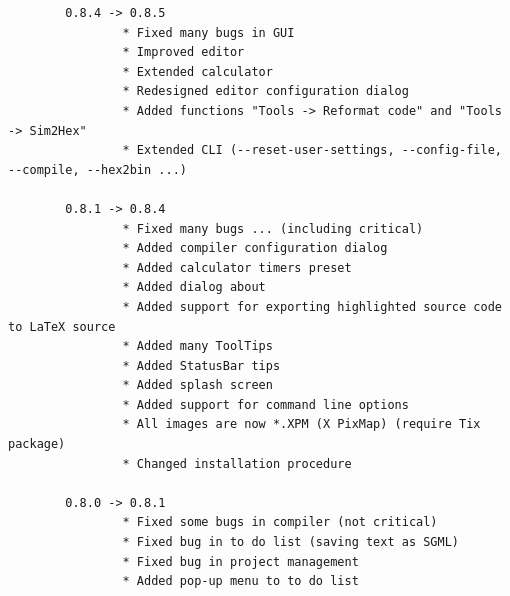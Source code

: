 \documentclass[a4paper,twoside,12pt]{book}
\begin{document}
{\begin{verbatim}
		0.8.4 -> 0.8.5
		        * Fixed many bugs in GUI
		        * Improved editor
		        * Extended calculator
		        * Redesigned editor configuration dialog
		        * Added functions "Tools -> Reformat code" and "Tools -> Sim2Hex"
		        * Extended CLI (--reset-user-settings, --config-file, --compile, --hex2bin ...)

		0.8.1 -> 0.8.4
		        * Fixed many bugs ... (including critical)
		        * Added compiler configuration dialog
		        * Added calculator timers preset
		        * Added dialog about
		        * Added support for exporting highlighted source code to LaTeX source
		        * Added many ToolTips
		        * Added StatusBar tips
		        * Added splash screen
		        * Added support for command line options
		        * All images are now *.XPM (X PixMap) (require Tix package)
		        * Changed installation procedure

		0.8.0 -> 0.8.1
		        * Fixed some bugs in compiler (not critical)
		        * Fixed bug in to do list (saving text as SGML)
		        * Fixed bug in project management
		        * Added pop-up menu to to do list
	\end{verbatim}
	}

\listoftables
\listoffigures
\end{document}

